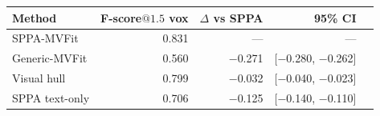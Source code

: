 \begin{tabular}{@{}lrrrr@{}}
\toprule
Method & F-score$@1.5$ vox & $\Delta$ vs SPPA & 95\% CI \\
\midrule
SPPA-MVFit & 0.831 & --- & --- \\
Generic-MVFit & 0.560 & $-$0.271 & [$-$0.280, $-$0.262] \\
Visual hull & 0.799 & $-$0.032 & [$-$0.040, $-$0.023] \\
SPPA text-only & 0.706 & $-$0.125 & [$-$0.140, $-$0.110] \\
\bottomrule
\end{tabular}
